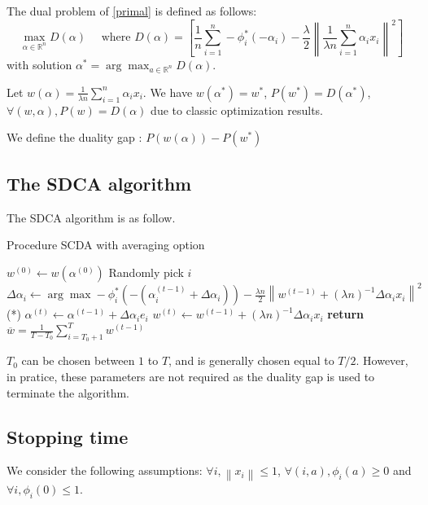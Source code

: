 \documentclass{article}
\newcommand{\norm}[1]{\left\|#1 \right\|}
\begin{document}
The dual problem of \eqref{primal} is defined as follows:
\begin{equation}
	\max_{\alpha \in \mathbb{R}^n} D(\alpha) \quad \text{ where } D(\alpha) = \left[ \dfrac{1}{n} \sum_{i=1}^n -\phi_i^{*}(-\alpha_i) - \dfrac{\lambda}{2}\norm{\dfrac{1}{\lambda n}\sum_{i=1}^n \alpha_ix_i}^2 \right]
	\label{dual}
\end{equation}
with solution $\alpha^{*} = \arg \max_{a \in \mathbb{R}^n} D(\alpha)$.

Let $w(\alpha) = \frac{1}{\lambda n} \sum_{i=1}^n \alpha_ix_i$.
We have $w(\alpha^{*}) = w^{*}$, $P(w^{*}) = D(\alpha^{*})$, $\forall (w,\alpha), P(w) = D(\alpha)$ due to classic optimization results.

We define the duality gap : $P(w(\alpha)) - P(w^{*})$

\subsection{The SDCA algorithm}

The SDCA algorithm is as follow.

\begin{algorithm}
	\caption{Procedure SCDA with averaging option}
	\begin{algorithmic}
		\State $w^{(0)} \gets w(\alpha^{(0)})$
		\State Randomly pick $i$
		\State $\Delta \alpha_i \gets \arg \max -\phi^{*}_i(-(\alpha_i^{(t-1)}+\Delta \alpha_i))-\frac{\lambda n}{2}\norm{w^{(t-1)}+(\lambda n)^{-1}\Delta \alpha_i x_i}^2$ \qquad \qquad \qquad \qquad \qquad (*)
		\State $\alpha^{(t)} \gets \alpha^{(t-1)} + \Delta \alpha_i e_i$
		\State $w^{(t)} \gets w^{(t-1)} + (\lambda n)^{-1} \Delta \alpha_i x_i$
		\EndFor
		\State \textbf{return} $\overline{w} = \frac{1}{T-T_0} \sum_{i = T_0+1}^T w^{(t-1)}$
		\EndProcedure
	\end{algorithmic}
\end{algorithm}

$T_0$ can be chosen between $1$ to $T$, and is generally chosen equal to $T/2$.
However, in pratice, these parameters are not required as the duality gap is used to terminate the algorithm.

\subsection{Stopping time}

We consider the following assumptions: $\forall i, \norm{x_i} \leq 1$, $\forall (i,a), \phi_i(a) \geq 0$ and $\forall i, \phi_i(0) \leq 1$.
\end{document}
